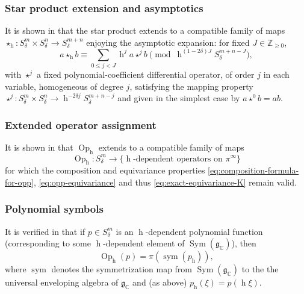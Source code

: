 \documentclass[reqno,10pt]{amsart}
\theoremstyle{plain} %
\theoremstyle{definition}
\theoremstyle{plain} %
\theoremstyle{remark}
\theoremstyle{itplain} %
\theoremstyle{remark} %
\renewcommand{\geq}{\geqslant}
\renewcommand{\leq}{\leqslant}
\numberwithin{equation}{section}
\DeclareMathOperator{\Sym}{Sym}
\DeclareMathOperator{\Opp}{Op}
\DeclareMathOperator{\sym}{sym}
\DeclareMathOperator{\h}{h}
\begin{document}
\subsubsection{Star product extension and asymptotics}\label{sec:35ac3e576d}
It is shown in \cite[\S4.6]{nelson-venkatesh-1} that the star product extends to a compatible family of maps $\star_{\h} : S^m_\delta \times S^n_\delta \rightarrow S^{m+n}_\delta$ enjoying the asymptotic expansion: for fixed $J \in \mathbb{Z}_{\geq 0}$,
\begin{equation}\label{eq:asymp-expn-star-prod}
  a \star_{\h} b
  \equiv \sum_{0 \leq j < J}
  \h^j a \star^j b
  \pmod{\h^{(1-2 \delta ) J} S_{\delta}^{m+n-J}},
\end{equation}
with $\star^j$ a fixed polynomial-coefficient differential operator, of order $j$ in each variable, homogeneous of degree $j$, satisfying the mapping property $\star^j : S^{m}_\delta \times S^{n}_\delta \rightarrow \h^{- 2 \delta j} S^{m+n-j}_\delta$ and given in the simplest case by $a \star^0 b = a b$.

\subsubsection{Extended operator assignment}\label{sec:35ac3e5770}
It is shown in \cite[\S5.6]{nelson-venkatesh-1} that $\Opp_{\h}$ extends to a compatible family of maps
\[
  \Opp_{\h} : S^m_\delta \rightarrow \{\text{$\h$-dependent operators on $\pi^\infty$}\}
\]
for which the composition and equivariance properties \eqref{eq:composition-formula-for-opp}, \eqref{eq:opp-equivariance} and thus \eqref{eq:exact-equivariance-K} remain valid.

\subsubsection{Polynomial symbols}\label{sec:35ac3e5771}
It is verified in \cite[\S5.2]{nelson-venkatesh-1} that if $p \in S^m_\delta$ is an $\h$-dependent polynomial function (corresponding to some $\h$-dependent element of $\Sym(\mathfrak{g}_\mathbb{C})$), then
\begin{equation}\label{eq:Opp-polynomial-symb}
  \Opp_{\h}(p)
  = \pi(\sym(p_{\h})),
\end{equation}
where $\sym$ denotes the symmetrization map from $\Sym(\mathfrak{g}_\mathbb{C})$ to the the universal enveloping algebra of $\mathfrak{g}_\mathbb{C}$ and (as above) $p_{\h}(\xi) = p(\h \xi)$.
\end{document}
